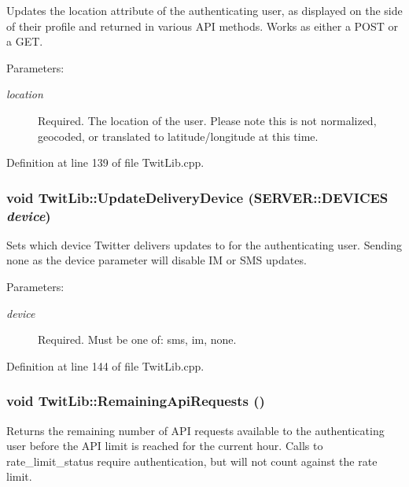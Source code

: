 Updates the location attribute of the authenticating user, as displayed on the side of their profile and returned in various API methods. Works as either a POST or a GET. \begin{Desc}
\item[Parameters:]
\begin{description}
\item[{\em location}]Required. The location of the user. Please note this is not normalized, geocoded, or translated to latitude/longitude at this time. \end{description}
\end{Desc}


Definition at line 139 of file TwitLib.cpp.\hypertarget{classTwitLib_b8fe352f9dc64231eddfaa86cfc473f9}{
\subsubsection{\setlength{\rightskip}{0pt plus 5cm}void TwitLib::UpdateDeliveryDevice ({\bf SERVER::DEVICES} {\em device})}}
\label{classTwitLib_b8fe352f9dc64231eddfaa86cfc473f9}


Sets which device Twitter delivers updates to for the authenticating user. Sending none as the device parameter will disable IM or SMS updates. \begin{Desc}
\item[Parameters:]
\begin{description}
\item[{\em device}]Required. Must be one of: sms, im, none. \end{description}
\end{Desc}


Definition at line 144 of file TwitLib.cpp.\hypertarget{classTwitLib_0a56abd6d94a6bccf0d761e7359c41ba}{
\subsubsection{\setlength{\rightskip}{0pt plus 5cm}void TwitLib::RemainingApiRequests ()}}
\label{classTwitLib_0a56abd6d94a6bccf0d761e7359c41ba}


Returns the remaining number of API requests available to the authenticating user before the API limit is reached for the current hour. Calls to rate\_\-limit\_\-status require authentication, but will not count against the rate limit. 


